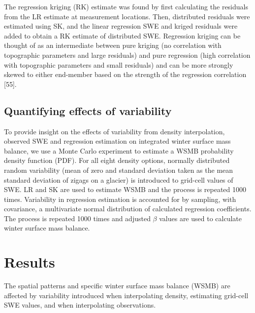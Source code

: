 \documentclass[twocolumn,letterpaper]{igs}
\begin{document}
The regression kriging (RK) estimate was found by first calculating the residuals from the LR estimate at measurement locations. Then, distributed residuals were estimated using SK, and the linear regression SWE and kriged residuals were added to obtain a RK estimate of distributed SWE. Regression kriging can be thought of as an intermediate between pure kriging (no correlation with topographic parameters and large residuals) and pure regression (high correlation with topographic parameters and small residuals) and can be more strongly skewed to either end-member based on the strength of the regression correlation [55].

\subsection{Quantifying effects of variability}

To provide insight on the effects of variability from density interpolation, observed SWE and regression estimation on integrated winter surface mass balance, we use a Monte Carlo experiment to estimate a WSMB probability density function (PDF). For all eight density options, normally distributed random variability (mean of zero and standard deviation taken as the mean standard deviation of zigags on a glacier) is introduced to grid-cell values of SWE. LR and SK are used to estimate WSMB and the process is repeated 1000 times.  Variability in regression estimation is accounted for by sampling, with covariance, a multivariate normal distribution of calculated regression coefficients. The process is repeated 1000 times and adjusted $\beta$ values are used to calculate winter surface mass balance. 

\pagebreak
\section{Results}

The spatial patterns and specific winter surface mass balance (WSMB) are affected by variability introduced when interpolating density, estimating grid-cell SWE values, and when interpolating observations.  





\end{document}
